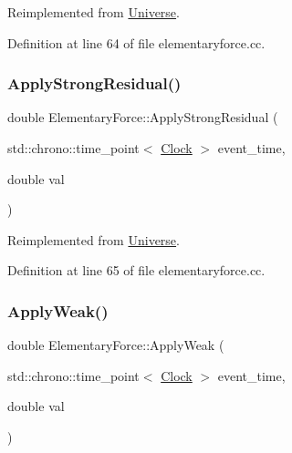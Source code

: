 Reimplemented from \mbox{\hyperlink{class_universe_a62789bcff84bd750b0366004381e2fdd}{Universe}}.



Definition at line 64 of file elementaryforce.\+cc.

\mbox{\label{class_elementary_force_a185dc4e0b840505df27dbbed9fdcdc7b}} 
\subsubsection{\texorpdfstring{Apply\+Strong\+Residual()}{ApplyStrongResidual()}}
{\footnotesize\ttfamily double Elementary\+Force\+::\+Apply\+Strong\+Residual (\begin{DoxyParamCaption}\item[{std\+::chrono\+::time\+\_\+point$<$ \mbox{\hyperlink{universe_8h_a0ef8d951d1ca5ab3cfaf7ab4c7a6fd80}{Clock}} $>$}]{event\+\_\+time,  }\item[{double}]{val }\end{DoxyParamCaption})\hspace{0.3cm}{\ttfamily [virtual]}}



Reimplemented from \mbox{\hyperlink{class_universe_af7becebb347be9a85541d96a3eca1ca7}{Universe}}.



Definition at line 65 of file elementaryforce.\+cc.

\mbox{\label{class_elementary_force_aabf66a859e6e808a65c6929cd16f7597}} 
\subsubsection{\texorpdfstring{Apply\+Weak()}{ApplyWeak()}}
{\footnotesize\ttfamily double Elementary\+Force\+::\+Apply\+Weak (\begin{DoxyParamCaption}\item[{std\+::chrono\+::time\+\_\+point$<$ \mbox{\hyperlink{universe_8h_a0ef8d951d1ca5ab3cfaf7ab4c7a6fd80}{Clock}} $>$}]{event\+\_\+time,  }\item[{double}]{val }\end{DoxyParamCaption})\hspace{0.3cm}{\ttfamily [virtual]}}



